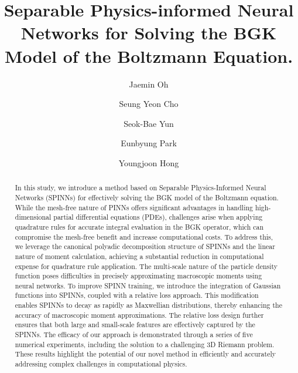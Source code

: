 \documentclass[preprint,12pt]{elsarticle}
\begin{document}
\begin{frontmatter}
\title{
Separable Physics-informed Neural Networks for Solving the BGK Model of the Boltzmann Equation.
}


\author[label1]{Jaemin Oh}

\author[label2]{Seung Yeon Cho}


\author[label3]{Seok-Bae Yun}

\author[label4]{Eunbyung Park}

\author[label1]{Youngjoon Hong}


\begin{abstract}
In this study, we introduce a method based on Separable Physics-Informed Neural Networks (SPINNs) for effectively solving the BGK model of the Boltzmann equation.
While the mesh-free nature of PINNs offers significant advantages in handling high-dimensional partial differential equations (PDEs), challenges arise when applying quadrature rules for accurate integral evaluation in the BGK operator, which can compromise the mesh-free benefit and increase computational costs.
To address this, we leverage the canonical polyadic decomposition structure of SPINNs and the linear nature of moment calculation, achieving a substantial reduction in computational expense for quadrature rule application.
The multi-scale nature of the particle density function poses difficulties in precisely approximating macroscopic moments using neural networks.
To improve SPINN training, we introduce the integration of Gaussian functions into SPINNs, coupled with a relative loss approach.
This modification enables SPINNs to decay as rapidly as Maxwellian distributions, thereby enhancing the accuracy of macroscopic moment approximations.
The relative loss design further ensures that both large and small-scale features are effectively captured by the SPINNs.
The efficacy of our approach is demonstrated through a series of five numerical experiments, including the solution to a challenging 3D Riemann problem. These results highlight the potential of our novel method in efficiently and accurately addressing complex challenges in computational physics.
\end{abstract}


\end{frontmatter}
\end{document}

